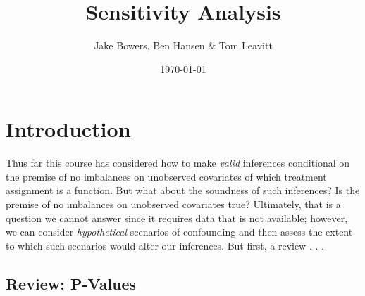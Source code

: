 \documentclass[11pt,leqno]{article}\usepackage[]{graphicx}\usepackage[]{color}
\title{Sensitivity Analysis}
\author{Jake Bowers, Ben Hansen \& Tom Leavitt}
\date{\today}
\theoremstyle{newstyle}
\begin{document}
\maketitle

\tableofcontents



\newpage

\section{Introduction}

Thus far this course has considered how to make \textit{valid} inferences conditional on the premise of no imbalances on unobserved covariates of which treatment assignment is a function. But what about the soundness of such inferences? Is the premise of no imbalances on unobserved covariates true? Ultimately, that is a question we cannot answer since it requires data that is not available; however, we can consider \textit{hypothetical} scenarios of confounding and then assess the extent to which such scenarios would alter our inferences. But first, a review . . .

\subsection{Review: P-Values}
\end{document}
